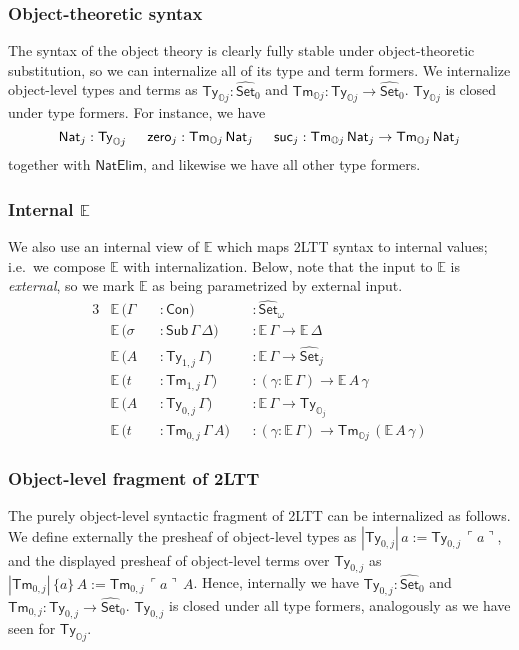 \documentclass[acmsmall]{acmart}
\newcommand{\msf}[1]{\mathsf{#1}}
\newcommand{\mbb}[1]{\mathbb{#1}}
\newcommand{\wh}[1]{\widehat{#1}}
\newcommand{\NatElim}{\msf{NatElim}}
\newcommand{\mbbo}{\mbb{O}}
\newcommand{\Con}{\msf{Con}}
\newcommand{\Sub}{\msf{Sub}}
\newcommand{\Ty}{\msf{Ty}}
\newcommand{\Tm}{\msf{Tm}}
\newcommand{\Nat}{\msf{Nat}}
\newcommand{\zero}{\msf{zero}}
\newcommand{\suc}{\msf{suc}}
\newcommand{\Set}{\mathsf{Set}}
\newcommand{\emb}[1]{\ulcorner#1\urcorner}
\newcommand{\ev}{\mbb{E}}
\theoremstyle{remark}
\newcommand{\whset}{\wh{\Set}}
\begin{document}
\subsubsection{Object-theoretic syntax} The syntax of the object theory is clearly
fully stable under object-theoretic substitution, so we can internalize all of
its type and term formers. We internalize object-level types and terms as
$\Ty_{\mbbo j} : \whset_0$ and $\Tm_{\mbbo j} : \Ty_{\mbbo j} \to
\whset_0$. $\Ty_{\mbbo j}$ is closed under type formers. For instance, we have
\[ \Nat_j : \Ty_{\mbbo j}\hspace{1.5em}\zero_j : \Tm_{\mbbo j}\,\Nat_j\hspace{1.5em}
    \suc_j : \Tm_{\mbbo j}\,\Nat_j \to \Tm_{\mbbo j}\,\Nat_j \]
together with $\NatElim$, and likewise we have all other type formers.
\subsubsection{Internal $\ev$} We also use an internal view of
$\ev$ which maps 2LTT syntax to internal values; i.e.\ we compose $\ev$ with
internalization. Below, note that the input to $\ev$ is \emph{external}, so we
mark $\ev$ as being parametrized by external input.
\begin{alignat*}{3}
  &\ev\,(\Gamma &&: \Con)                      &&: \whset_\omega \\
  &\ev\,(\sigma &&: \Sub\,\Gamma\,\Delta)      &&: \ev\,\Gamma \to \ev\,\Delta \\
  &\ev\,(A      &&: \Ty_{1,j}\,\Gamma)          &&: \ev\,\Gamma \to \whset_j\\
  &\ev\,(t      &&: \Tm_{1,j}\,\Gamma)          &&: (\gamma : \ev\,\Gamma) \to \ev\,A\,\gamma\\
  &\ev\,(A      &&: \Ty_{0,j}\,\Gamma)          &&: \ev\,\Gamma \to \Ty_{\mbbo_j}\\
  &\ev\,(t      &&: \Tm_{0,j}\,\Gamma\,A)       &&: (\gamma : \ev\,\Gamma) \to \Tm_{\mbbo j}\,(\ev\,A\,\gamma)
\end{alignat*}
\subsubsection{Object-level fragment of 2LTT}
The purely object-level syntactic fragment of 2LTT can be internalized as
follows. We define externally the presheaf of object-level types as
$|\Ty_{0,j}|\,a := \Ty_{0,j}\,\emb{a}$, and the displayed presheaf of
object-level terms over $\Ty_{0,j}$ as $|\Tm_{0,j}|\,\{a\}\,A :=
\Tm_{0,j}\,\emb{a}\,A$. Hence, internally we have $\Ty_{0,j} : \whset_0$ and
$\Tm_{0,j} : \Ty_{0,j} \to \whset_0$. $\Ty_{0,j}$ is closed under all type formers,
analogously as we have seen for $\Ty_{\mbbo j}$.
\end{document}
